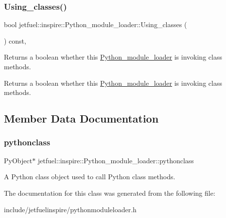 \subsubsection{\texorpdfstring{Using\+\_\+classes()}{Using\_classes()}}
{\footnotesize\ttfamily bool jetfuel\+::inspire\+::\+Python\+\_\+module\+\_\+loader\+::\+Using\+\_\+classes (\begin{DoxyParamCaption}{ }\end{DoxyParamCaption}) const\hspace{0.3cm}{\ttfamily [inline]}, {\ttfamily [protected]}}



Returns a boolean whether this \hyperlink{classjetfuel_1_1inspire_1_1Python__module__loader}{Python\+\_\+module\+\_\+loader} is invoking class methods. 

Returns a boolean whether this \hyperlink{classjetfuel_1_1inspire_1_1Python__module__loader}{Python\+\_\+module\+\_\+loader} is invoking class methods. 

\subsection{Member Data Documentation}
\mbox{\label{classjetfuel_1_1inspire_1_1Python__module__loader_a973a8f86d446820b38b18f87fe51465a}} 
\subsubsection{\texorpdfstring{pythonclass}{pythonclass}}
{\footnotesize\ttfamily Py\+Object$\ast$ jetfuel\+::inspire\+::\+Python\+\_\+module\+\_\+loader\+::pythonclass\hspace{0.3cm}{\ttfamily [protected]}}

A Python class object used to call Python class methods. 

The documentation for this class was generated from the following file\+:\begin{DoxyCompactItemize}
\item 
include/jetfuelinspire/pythonmoduleloader.\+h\end{DoxyCompactItemize}
